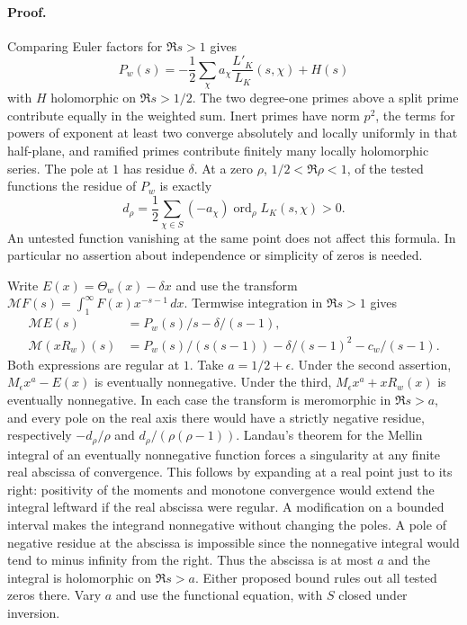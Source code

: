 \paragraph{Proof.}
Comparing Euler factors for $\Re s>1$ gives
\[
 P_w(s)=-\frac12\sum_\chi a_\chi\frac{L'_K}{L_K}(s,\chi)+H(s)
\]
with $H$ holomorphic on $\Re s>1/2$.
The two degree-one primes above a split prime contribute equally in the
weighted sum. Inert primes have norm $p^2$, the terms for powers of exponent
at least two converge absolutely and locally uniformly in that half-plane,
and ramified primes contribute finitely many locally holomorphic series.
The pole at $1$ has residue $\delta$. At a zero $\rho$, $1/2<\Re\rho<1$,
of the tested functions the residue of $P_w$ is exactly
\[
 d_\rho=\frac12\sum_{\chi\in S}(-a_\chi)\operatorname{ord}_\rho L_K(s,\chi)>0.
\]
An untested function vanishing at the same point does not affect this
formula. In particular no assertion about independence or simplicity of
zeros is needed.

Write $E(x)=\Theta_w(x)-\delta x$ and use the transform
$\mathcal M F(s)=\int_1^\infty F(x)x^{-s-1}\,dx$. Termwise integration
in $\Re s>1$ gives
\begin{align*}
 \mathcal M E(s)&=P_w(s)/s-\delta/(s-1),\\
 \mathcal M(xR_w)(s)&=P_w(s)/(s(s-1))-\delta/(s-1)^2-c_w/(s-1).
\end{align*}
Both expressions are regular at $1$. Take $a=1/2+\epsilon$. Under the
second assertion, $M_\epsilon x^a-E(x)$ is eventually nonnegative.
Under the third, $M_\epsilon x^a+xR_w(x)$ is eventually nonnegative.
In each case the transform is meromorphic in $\Re s>a$, and every pole
on the real axis there would have a strictly negative residue, respectively
$-d_\rho/\rho$ and $d_\rho/(\rho(\rho-1))$.
Landau's theorem for the Mellin integral of an eventually nonnegative
function forces a singularity at any finite real abscissa of convergence.
This follows by expanding at a real point just to its right: positivity
of the moments and monotone convergence would extend the integral leftward
if the real abscissa were regular. A modification on a bounded interval
makes the integrand nonnegative without changing the poles.
A pole of negative residue at the abscissa is impossible since the
nonnegative integral would tend to minus infinity from the right. Thus the
abscissa is at most $a$ and the integral is holomorphic on $\Re s>a$.
Either proposed bound rules out all tested zeros there. Vary $a$ and use the
functional equation, with $S$ closed under inversion.

